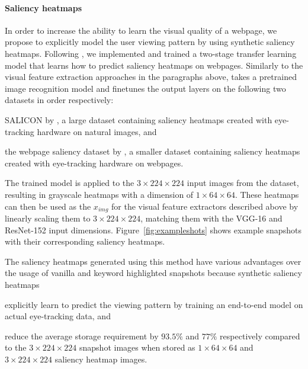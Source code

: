 \paragraph{Saliency heatmaps}
In order to increase the ability to learn the visual quality of a webpage, we propose to explicitly model the user viewing pattern by using synthetic saliency heatmaps. 
Following \cite{shan2017two}, we implemented and trained a two-stage transfer learning model that learns how to predict saliency heatmaps on webpages.
Similarly to the visual feature extraction approaches in the paragraphs above, \cite{shan2017two} takes a pretrained image recognition model and finetunes the output layers on the following two datasets in order respectively:
\begin{inparaenum}[(i)]
\item SALICON by \cite{jiang2015salicon}, a large dataset containing saliency heatmaps created with eye-tracking hardware on natural images, and 
\item the webpage saliency dataset by \cite{shen2014webpage}, a smaller dataset containing saliency heatmaps created with eye-tracking hardware on webpages.
\end{inparaenum}

The trained model is applied to the $3\times224\times224$ input images from the \datasetname data\-set, resulting in grayscale heatmaps with a dimension of $1\times64\times64$. These heatmaps can then be used as the $x_{img}$ for the visual feature extractors described above by linearly scaling them to $3\times224\times224$, matching them with the VGG-16 and ResNet-152 input dimensions. Figure~\ref{fig:exampleshots} shows example snapshots with their corresponding saliency heatmaps.

The saliency heatmaps generated using this method have various advantages over the usage of vanilla and keyword highlighted snapshots because synthetic saliency heatmaps
\begin{inparaenum}[(i)]
\item explicitly learn to predict the viewing pattern by training an end-to-end model on actual eye-tracking data, and 
\item reduce the average storage requirement by $93.5\%$ and $77\%$ respectively compared to the $3\times224\times224$ snapshot images when stored as $1\times64\times64$ and $3\times224\times224$ saliency heatmap images.
\end{inparaenum}
